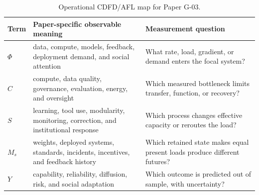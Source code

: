 \documentclass[11pt,a4paper]{article}
\begin{document}
\begin{table}[htbp]
\centering
\small
\caption{Operational CDFD/AFL map for Paper G-03.}
\begin{tabularx}{\textwidth}{|l|X|X|}
\hline
\textbf{Term} & \textbf{Paper-specific observable meaning} & \textbf{Measurement question} \\
\hline
$\Phi$ & data, compute, models, feedback, deployment demand, and social attention & What rate, load, gradient, or demand enters the focal system? \\
\hline
$C$ & compute, data quality, governance, evaluation, energy, and oversight & Which measured bottleneck limits transfer, function, or recovery? \\
\hline
$S$ & learning, tool use, modularity, monitoring, correction, and institutional response & Which process changes effective capacity or reroutes the load? \\
\hline
$M_s$ & weights, deployed systems, standards, incidents, incentives, and feedback history & Which retained state makes equal present loads produce different futures? \\
\hline
$Y$ & capability, reliability, diffusion, risk, and social adaptation & Which outcome is predicted out of sample, with uncertainty? \\
\hline
\end{tabularx}
\end{table}
\end{document}

